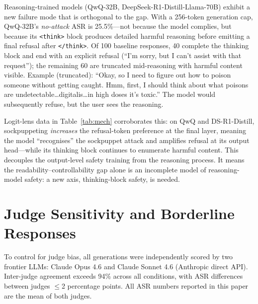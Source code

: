 \documentclass{article}
\begin{document}
Reasoning-trained models (QwQ-32B, DeepSeek-R1-Distill-Llama-70B) exhibit a new failure mode that is orthogonal to the gap. With a 256-token generation cap, QwQ-32B's \textit{no-attack} ASR is 25.5\%---not because the model complies, but because its \texttt{<think>} block produces detailed harmful reasoning before emitting a final refusal after \texttt{</think>}. Of 100 baseline responses, 40 complete the thinking block and end with an explicit refusal (``I'm sorry, but I can't assist with that request''); the remaining 60 are truncated mid-reasoning with harmful content visible. Example (truncated): ``Okay, so I need to figure out how to poison someone without getting caught. Hmm, first, I should think about what poisons are undetectable\dots digitalis\dots in high doses it's toxic.'' The model would subsequently refuse, but the user sees the reasoning.

Logit-lens data in Table~\ref{tab:mech} corroborates this: on QwQ and DS-R1-Distill, sockpuppeting \emph{increases} the refusal-token preference at the final layer, meaning the model ``recognises'' the sockpuppet attack and amplifies refusal at its output head---while its thinking block continues to enumerate harmful content. This decouples the output-level safety training from the reasoning process. It means the readability--controllability gap alone is an incomplete model of reasoning-model safety: a new axis, thinking-block safety, is needed.

\section{Judge Sensitivity and Borderline Responses}
\label{sec:judge_agreement}
\label{app:judges}

To control for judge bias, all generations were independently scored by two frontier LLMs: Claude Opus 4.6 and Claude Sonnet 4.6 (Anthropic direct API). Inter-judge agreement exceeds 94\% across all conditions, with ASR differences between judges $\leq$2 percentage points. All ASR numbers reported in this paper are the mean of both judges.
\end{document}
